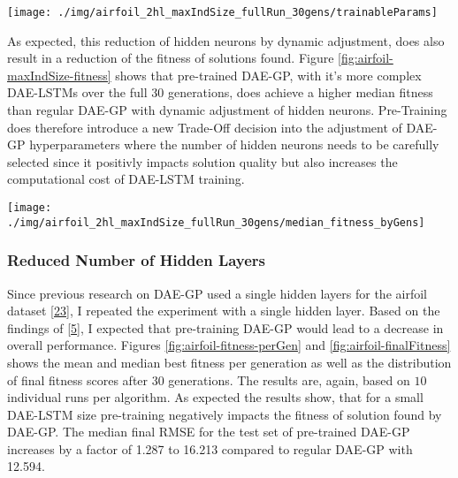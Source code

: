 \documentclass[
  11pt,
]{article}
\let\origfigure\figure
\let\endorigfigure\endfigure
\renewenvironment{figure}[1][2] {
    \expandafter\origfigure\expandafter[H]
} {
    \endorigfigure
}
\begin{document}
\begin{figure}[c]

{\centering \texttt{[image: ./img/airfoil\_2hl\_maxIndSize\_fullRun\_30gens/trainableParams]} 

}

\caption{Median Number of trainable Parameters over 30 Generations - Airfoil - Dynamic adjustment of regular DAE-GP}\label{fig:airfoil-maxIndSize-params}
\end{figure}

As expected, this reduction of hidden neurons by dynamic adjustment, does also result in a reduction of the fitness of solutions found. Figure \ref{fig:airfoil-maxIndSize-fitness} shows that pre-trained DAE-GP, with it's more complex DAE-LSTMs over the full 30 generations, does achieve a higher median fitness than regular DAE-GP with dynamic adjustment of hidden neurons. Pre-Training does therefore introduce a new Trade-Off decision into the adjustment of DAE-GP hyperparameters where the number of hidden neurons needs to be carefully selected since it positivly impacts solution quality but also increases the computational cost of DAE-LSTM training.

\begin{figure}[c]

{\centering \texttt{[image: ./img/airfoil\_2hl\_maxIndSize\_fullRun\_30gens/median\_fitness\_byGens]} 

}

\caption{Median Best Fitness over 30 Generations - Airfoil - Dynamic adjustment of regular DAE-GP}\label{fig:airfoil-maxIndSize-fitness}
\end{figure}

\hypertarget{reduced-number-of-hidden-layers}{%
\subsubsection{Reduced Number of Hidden Layers}\label{reduced-number-of-hidden-layers}}

Since previous research on DAE-GP used a single hidden layers for the airfoil dataset {[}\protect\hyperlink{ref-dae-gp_2022_symreg}{23}{]}, I repeated the experiment with a single hidden layer. Based on the findings of {[}\protect\hyperlink{ref-pmlr-v5-erhan09a}{5}{]}, I expected that pre-training DAE-GP would lead to a decrease in overall performance. Figures \ref{fig:airfoil-fitness-perGen} and \ref{fig:airfoil-finalFitness} shows the mean and median best fitness per generation as well as the distribution of final fitness scores after 30 generations. The results are, again, based on \(10\) individual runs per algorithm. As expected the results show, that for a small DAE-LSTM size pre-training negatively impacts the fitness of solution found by DAE-GP. The median final RMSE for the test set of pre-trained DAE-GP increases by a factor of 1.287 to 16.213 compared to regular DAE-GP with 12.594.
\end{document}
